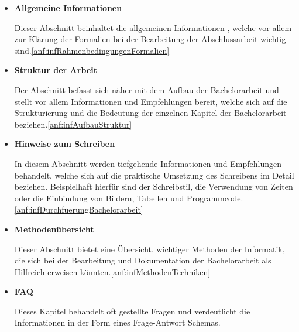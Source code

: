 \documentclass[bibliography=totoc,listof=totoc,BCOR=5mm,DIV=12,oneside]{scrbook}
\begin{document}
\begin{itemize}
\item \textbf{Allgemeine Informationen}
\par Dieser Abschnitt beinhaltet die allgemeinen Informationen , welche vor allem zur Klärung der Formalien bei der Bearbeitung der Abschlussarbeit wichtig sind.\ref{anf:infRahmenbedingungenFormalien}

\item \textbf{Struktur der Arbeit}
\par Der Abschnitt befasst sich näher mit dem Aufbau der Bachelorarbeit und stellt vor allem Informationen und Empfehlungen bereit, welche sich auf die Strukturierung und die Bedeutung der einzelnen Kapitel der Bachelorarbeit beziehen.\ref{anf:infAufbauStruktur}

\item \textbf{Hinweise zum Schreiben}
\par In diesem Abschnitt werden tiefgehende Informationen und Empfehlungen behandelt, welche sich auf die praktische Umsetzung des Schreibens im Detail beziehen. Beispielhaft hierfür sind der Schreibstil, die Verwendung von Zeiten oder die Einbindung von Bildern, Tabellen und Programmcode.\ref{anf:infDurchfuerungBachelorarbeit}

\item \textbf{Methodenübersicht}
\par Dieser Abschnitt bietet eine Übersicht, wichtiger Methoden der Informatik, die sich bei der Bearbeitung und Dokumentation der Bachelorarbeit als Hilfreich erweisen könnten.\ref{anf:infMethodenTechniken}

\item \textbf{FAQ}
\par Dieses Kapitel behandelt oft gestellte Fragen und verdeutlicht die Informationen in der Form eines Frage-Antwort Schemas.
\end{itemize}
\end{document}
